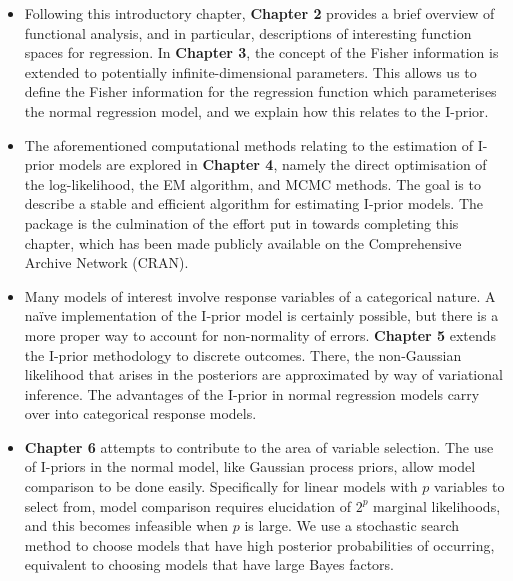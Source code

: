 \documentclass[a4paper,showframe,11pt]{report}
\begin{document}
\begin{itemize}
  \item Following this introductory chapter, \textbf{Chapter 2} provides a brief overview of functional analysis, and in particular, descriptions of interesting function spaces for regression.
  In \textbf{Chapter 3}, the concept of the Fisher information is extended to potentially infinite-dimensional parameters.
  This allows us to define the Fisher information for the regression function which parameterises the normal regression model, and we explain how this relates to the I-prior.
  
  \item The aforementioned computational methods relating to the estimation of I-prior models are explored in \textbf{Chapter 4}, namely the direct optimisation of the log-likelihood, the EM algorithm, and MCMC methods.
  The goal is to describe a stable and efficient algorithm for estimating I-prior models.
  The  package  is the culmination of the effort put in towards completing this chapter, which has been made publicly available on the Comprehensive  Archive Network (CRAN).

  \item Many models of interest involve response variables of a categorical nature.
  A naïve implementation of the I-prior model is certainly possible, but there is  a more proper way to account for non-normality of errors.
  \textbf{Chapter 5} extends the I-prior methodology to discrete outcomes.
  There, the non-Gaussian likelihood that arises in the posteriors are approximated by way of variational inference.
  The advantages of the I-prior in normal regression models carry over into categorical response models.

  \item \textbf{Chapter 6} attempts to contribute to the area of variable selection.
  The use of I-priors in the normal model, like Gaussian process priors, allow model comparison to be done easily.
  Specifically for linear models with $p$ variables to select from, model comparison requires elucidation of $2^p$ marginal likelihoods, and this becomes infeasible when $p$ is large.
  We use a stochastic search method to choose models that have high posterior probabilities of occurring, equivalent to choosing models that have large Bayes factors.
\end{itemize}
\end{document}
